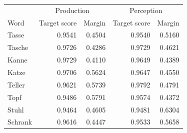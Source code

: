 \begin{tabular}{lrrrr}
\toprule
& \multicolumn{2}{c}{Production} & \multicolumn{2}{c}{Perception}\\
Word & Target score & Margin & Target score & Margin\\
\midrule
Tasse & 0.9541 & 0.4504 & 0.9540 & 0.5160\\
Tasche & 0.9726 & 0.4286 & 0.9729 & 0.4621\\
Kanne & 0.9729 & 0.4110 & 0.9649 & 0.4389\\
Katze & 0.9706 & 0.5624 & 0.9647 & 0.4550\\
Teller & 0.9621 & 0.5739 & 0.9792 & 0.4791\\
Topf & 0.9486 & 0.5791 & 0.9574 & 0.4372\\
Stuhl & 0.9464 & 0.4605 & 0.9481 & 0.6304\\
Schrank & 0.9616 & 0.4447 & 0.9533 & 0.5658\\
\bottomrule
\end{tabular}
